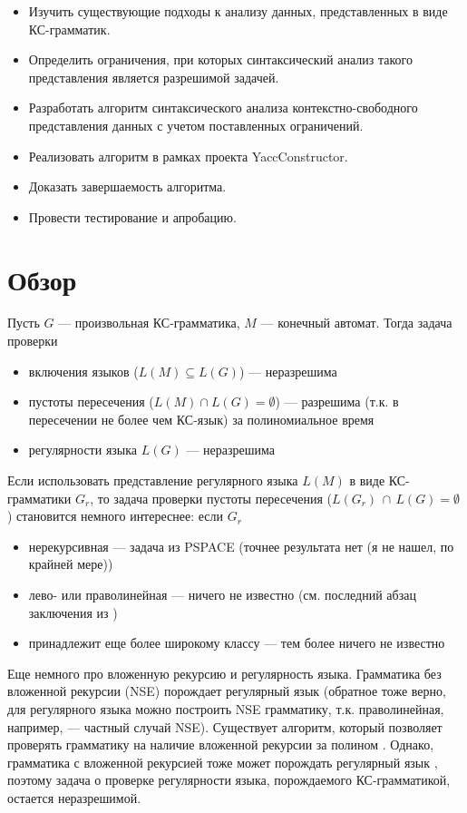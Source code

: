 \documentclass[14pt]{matmex-diploma-custom}
\begin{document}
\begin{itemize}
	\item Изучить существующие подходы к анализу данных, представленных в виде КС-грамматик.
	\item Определить ограничения, при которых синтаксический анализ такого представления является разрешимой задачей.
	\item Разработать алгоритм синтаксического анализа контекстно-свободного представления данных с учетом поставленных ограничений.
	\item Реализовать алгоритм в рамках проекта YaccConstructor.
	\item Доказать завершаемость алгоритма.
	\item Провести тестирование и апробацию.
\end{itemize}

\section{Обзор}

Пусть $G$ --- произвольная КС-грамматика, $M$ --- конечный автомат. Тогда задача проверки
\begin{itemize}
	\item включения языков ($L(M) \subseteq L(G)$) --- неразрешима
	\item пустоты пересечения ($L(M) \cap L(G) = \emptyset$) --- разрешима (т.к. в пересечении не более чем КС-язык) за полиномиальное время \cite{Hunt}
	\item регулярности языка $L(G)$ --- неразрешима \cite{Greibach1968}
\end{itemize} 

Если использовать представление регулярного языка $L(M)$ в виде КС-грамматики $G_r$, то задача проверки пустоты пересечения ($L(G_r) \, \cap \, L(G) = \emptyset$) становится немного интереснее: если $G_r$ 
\begin{itemize}
	\item нерекурсивная --- задача из PSPACE \cite{Nederhof} (точнее результата нет (я не нашел, по крайней мере))
	\item лево- или праволинейная --- ничего не известно (см. последний абзац заключения из \cite{Nederhof})
	\item принадлежит еще более широкому классу --- тем более ничего не известно
\end{itemize}

Еще немного про вложенную рекурсию и регулярность языка. Грамматика без вложенной рекурсии (NSE) порождает регулярный язык \cite{Chomsky} (обратное тоже верно, для регулярного языка можно построить NSE грамматику, т.к. праволинейная, например, --- частный случай NSE). Существует алгоритм, который позволяет проверять грамматику на наличие вложенной рекурсии за полином \cite{Anselmo}. Однако, грамматика с вложенной рекурсией тоже может порождать регулярный язык \cite{Andrei2004}, поэтому задача о проверке регулярности языка, порождаемого КС-грамматикой, остается неразрешимой. 
\end{document}
